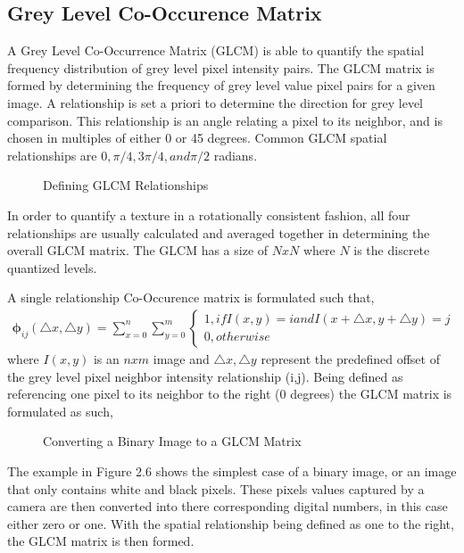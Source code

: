 \subsection{Grey Level Co-Occurence Matrix}
A Grey Level Co-Occurrence Matrix (GLCM) is able to quantify the spatial frequency distribution of grey level pixel intensity pairs. The GLCM matrix is formed by determining the frequency of grey level value pixel pairs for a given image.  A relationship is set a priori to determine the direction for grey level comparison.  This relationship is an angle relating a pixel to its neighbor, and is chosen in multiples of either 0 or 45 degrees.  Common GLCM spatial relationships are $0, \pi/4, 3\pi/4, and \pi/2$ radians.
%
\begin{figure}[!htb]
    \begin{center}
    \end{center}
    \caption{Defining GLCM Relationships}
    \label{fig:texture}
\end{figure}
%
In order to quantify a texture in a rotationally consistent fashion, all four relationships are usually calculated and averaged together in determining the overall GLCM matrix.  The GLCM has a size of $N x N$ where $N$ is the discrete quantized levels.

A single relationship Co-Occurence matrix is formulated such that,
%
\begin{align}
    \mathbf{\phi}_{ij}(\triangle x,\triangle y) = \sum_{x=0}^{n}\sum_{y=0}^{m}
    \begin{cases}
        1, if I(x,y) = i  and  I(x+\triangle x,y+\triangle y) = j \\
        0, otherwise
    \end{cases}
\end{align}
%
where $I(x,y)$ is an $n x m$ image and $\triangle x,\triangle y$ represent the predefined offset of the grey level pixel neighbor intensity relationship (i,j).
Being defined as referencing one pixel to its neighbor to the right (0 degrees) the GLCM matrix is formulated as such,
%
\begin{figure}[!htb]
    \begin{center}
    \end{center}
    \caption{Converting a Binary Image to a GLCM Matrix}
    \label{fig:texture}
\end{figure}
The example in Figure 2.6 shows the simplest case of a binary image, or an image that only contains white and black pixels.  These pixels values captured by a camera are then converted into there corresponding digital numbers, in this case either zero or one.  With the spatial relationship being defined as one to the right, the GLCM matrix is then formed.

